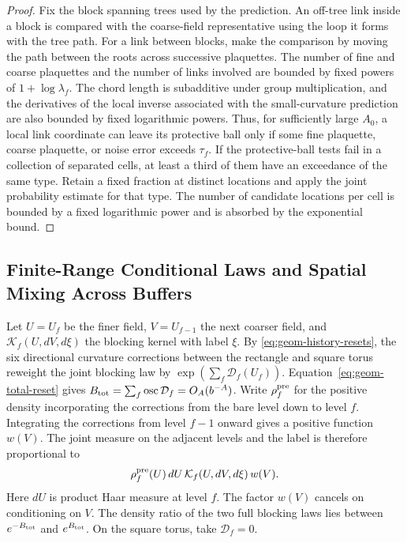 \documentclass[11pt,a4paper]{article}
\numberwithin{equation}{section}
\begin{document}
\begin{proof}
Fix the block spanning trees used by the prediction. An off-tree link inside a block is compared with the coarse-field representative using the loop it forms with the tree path. For a link between blocks, make the comparison by moving the path between the roots across successive plaquettes. The number of fine and coarse plaquettes and the number of links involved are bounded by fixed powers of \(1+\log\lambda_f\). The chord length is subadditive under group multiplication, and the derivatives of the local inverse associated with the small-curvature prediction are also bounded by fixed logarithmic powers. Thus, for sufficiently large \(A_0\), a local link coordinate can leave its protective ball only if some fine plaquette, coarse plaquette, or noise error exceeds \(\tau_f\). If the protective-ball tests fail in a collection of separated cells, at least a third of them have an exceedance of the same type. Retain a fixed fraction at distinct locations and apply the joint probability estimate for that type. The number of candidate locations per cell is bounded by a fixed logarithmic power and is absorbed by the exponential bound.
\end{proof}

\subsection{Finite-Range Conditional Laws and Spatial Mixing Across Buffers}

Let \(U=U_f\) be the finer field, \(V=U_{f-1}\) the next coarser field, and \(\mathcal K_f(U,dV,d\xi)\) the blocking kernel with label \(\xi\). By \eqref{eq:geom-history-resets}, the six directional curvature corrections between the rectangle and square torus reweight the joint blocking law by \(\exp(\sum_f\mathcal D_f(U_f))\). Equation~\eqref{eq:geom-total-reset} gives
\(B_{\rm tot}=\sum_f\operatorname{osc}\mathcal D_f=O_A(b^{-A})\).
Write \(\rho_f^{\rm pre}\) for the positive density incorporating the corrections from the bare level down to level \(f\). Integrating the corrections from level \(f-1\) onward gives a positive function \(w(V)\). The joint measure on the adjacent levels and the label is therefore proportional to
\begin{equation}
 \rho_f^{\rm pre}(U)\,dU\,\mathcal K_f(U,dV,d\xi)\,w(V).
 \label{cam-bound-prefix}
\end{equation}
Here \(dU\) is product Haar measure at level \(f\). The factor \(w(V)\) cancels on conditioning on \(V\). The density ratio of the two full blocking laws lies between \(e^{-B_{\rm tot}}\) and \(e^{B_{\rm tot}}\). On the square torus, take \(\mathcal D_f=0\).
\end{document}
